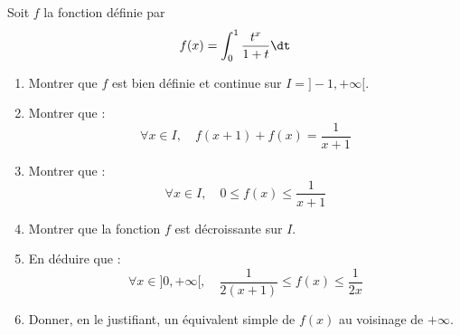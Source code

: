 \documentclass[a4paper,10pt]{report}
\begin{document}
\begin{Exercice}{} Soit $f$ la fonction d\'efinie par 
$$f(x)=\int_0^1 \frac{t^x}{1+t} \dt$$
	\begin{enumerate}
	\item Montrer que $f$ est bien d\'efinie et continue sur $I=]-1, + \infty[$.

	\item Montrer que :
$$\forall x\in I,\quad f(x+1)+f(x)=\frac1{x+1}$$

	\item Montrer que :
$$\forall x\in I,\quad 0\leq f(x) \leq \frac1{x+1}$$

	\item Montrer que la fonction $f$ est d\'ecroissante sur $I$.

	\item En d\'eduire que :
$$\forall x\in]0,+\infty[,\quad \frac1{2(x+1)} \leq f(x) \leq \frac1{2x}$$

	\item Donner, en le justifiant, un \'equivalent simple de $f(x)$ au voisinage de $+\infty$.
	\end{enumerate}
\end{Exercice}

\corr 
\end{document}
